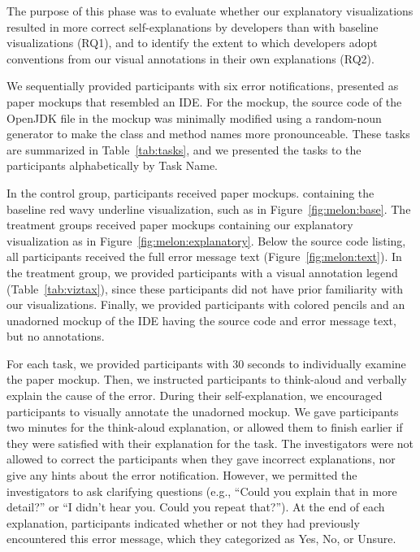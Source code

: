 \documentclass[conference]{IEEEtran}
\begin{document}

The purpose of this phase was to evaluate whether our explanatory visualizations resulted in more correct self-explanations by developers than with baseline visualizations (RQ1), and to identify the extent to which developers adopt conventions from our visual annotations in their own explanations (RQ2).

We sequentially provided participants with six error notifications, presented as paper mockups that resembled an IDE. For the mockup, the source code of the OpenJDK file in the mockup was minimally modified using a random-noun generator to make the class and method names more pronounceable. These tasks are summarized in Table~\ref{tab:tasks}, and we presented the tasks to the participants alphabetically by Task Name. 

In the control group, participants received paper mockups. containing the baseline red wavy underline visualization, such as in Figure~\ref{fig:melon:base}. The treatment groups received paper mockups containing our explanatory visualization as in Figure~\ref{fig:melon:explanatory}. Below the source code listing, all participants received the full error message text (Figure~\ref{fig:melon:text}). In the treatment group, we provided participants with a visual annotation legend (Table~\ref{tab:viztax}), since these participants did not have prior familiarity with our visualizations. Finally, we provided participants with colored pencils and an unadorned mockup of the IDE having the source code and error message text, but no annotations.

For each task, we provided participants with 30 seconds to individually examine the paper mockup. Then, we instructed participants to think-aloud and verbally explain the cause of the error. During their self-explanation, we encouraged participants to visually annotate the unadorned mockup. We gave participants two minutes for the think-aloud explanation, or allowed them to finish earlier if they were satisfied with their explanation for the task. The investigators were not allowed to correct the participants when they gave incorrect explanations, nor give any hints about the error notification. However, we permitted the investigators to ask clarifying questions (e.g., ``Could you explain that in more detail?'' or ``I didn't hear you. Could you repeat that?''). At the end of each explanation, participants indicated whether or not they had previously encountered this error message, which they categorized as Yes, No, or Unsure.
\end{document}
